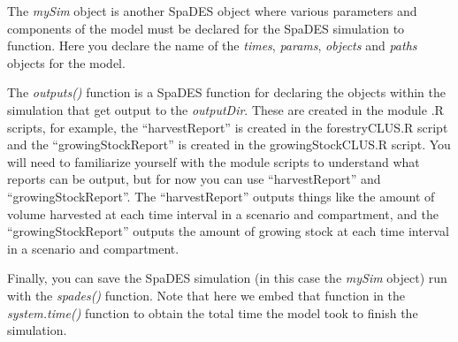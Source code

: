 \documentclass[
]{article}
\begin{document}
The \emph{mySim} object is another SpaDES object where various
parameters and components of the model must be declared for the SpaDES
simulation to function. Here you declare the name of the \emph{times},
\emph{params}, \emph{objects} and \emph{paths} objects for the model.

The \emph{outputs()} function is a SpaDES function for declaring the
objects within the simulation that get output to the \emph{outputDir}.
These are created in the module .R scripts, for example, the
``harvestReport'' is created in the forestryCLUS.R script and the
``growingStockReport'' is created in the growingStockCLUS.R script. You
will need to familiarize yourself with the module scripts to understand
what reports can be output, but for now you can use ``harvestReport''
and ``growingStockReport''. The ``harvestReport'' outputs things like
the amount of volume harvested at each time interval in a scenario and
compartment, and the ``growingStockReport'' outputs the amount of
growing stock at each time interval in a scenario and compartment.

Finally, you can save the SpaDES simulation (in this case the
\emph{mySim} object) run with the \emph{spades()} function. Note that
here we embed that function in the \emph{system.time()} function to
obtain the total time the model took to finish the simulation.
\end{document}
